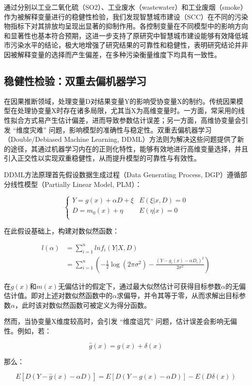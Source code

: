 \documentclass[a4paper,12pt]{article}
\begin{document}
通过分别以工业二氧化硫（SO2）、工业废水（wastewater）和工业废烟（smoke）作为被解释变量进行的稳健性检验，我们发现智慧城市建设（SCC）在不同的污染物指标下对其排放均呈现出显著的抑制作用。各控制变量在不同模型中的影响方向和显著性也基本符合预期，这进一步支持了原研究中智慧城市建设能够有效降低城市污染水平的结论，极大地增强了研究结果的可靠性和稳健性，表明研究结论并非因被解释变量的选择而产生偏差，在多种污染衡量维度下均具有一致性。 


\subsection{稳健性检验：双重去偏机器学习}
在因果推断领域，处理变量D对结果变量Y的影响受协变量X的制约。传统因果模型在处理协变量X时存在诸多局限，尤其当X为高维变量时。一方面，常采用的线性拟合方式易产生估计偏差，进而导致参数估计误差；另一方面，高维协变量会引发 “维度灾难” 问题，影响模型的准确性与稳定性。双重去偏机器学习（Double/Debiased Machine Learning, DDML）方法则为解决这些问题提供了新的途径，其通过机器学习内在的正则化特性，能够有效地进行高维变量选择，并且引入正交性以实现双重稳健性，从而提升模型的可靠性与有效性。

DDML方法原理首先假设数据生成过程（Data Generating Process, DGP）遵循部分线性模型（Partially Linear Model, PLM）：

\[
\begin{cases}
Y = g(x) + \alpha D + \xi & E(\xi|x, D) = 0 \\
D = m_0(x) + \eta & E(\eta|x) = 0 \\
\end{cases}
\]

在此假设基础上，构建对数似然函数：

\begin{align*}
l(\alpha) &= \sum_{i=1}^{n} ln f_i(Y|X,D) \\
&= \sum_{i=1}^{n} \left( -\frac{1}{2} \log (2\pi\sigma^2) - \frac{(Y - g_i(x) - \alpha D_i)^2}{2\sigma^2} \right)
\end{align*}

在\( g(x)\)和\( m(x) \)无偏估计的假定下，通过最大似然估计可获得目标参数$\alpha$的无偏估计值。即对上述对数似然函数中的$\alpha$求偏导，并令其等于零，从而求解出目标参数$\alpha$，此时该对数似然函数可被定义为得分函数。

然而，当协变量X维度较高时，会引发 “维度诅咒” 问题，估计误差会影响无偏性。例如，若：

$$
\hat{g}(x) = g(x) + \delta(x) 
$$

那么：

\[
E[D(Y - \hat{g}(x) - \alpha D)] = E[D(Y - g(x) - \alpha D)] - E(D\delta(x))
\]
\end{document}
